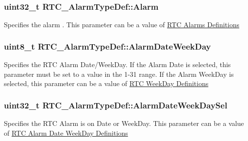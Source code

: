 \subsubsection[{\texorpdfstring{Alarm}{Alarm}}]{\setlength{\rightskip}{0pt plus 5cm}uint32\+\_\+t R\+T\+C\+\_\+\+Alarm\+Type\+Def\+::\+Alarm}\hypertarget{struct_r_t_c___alarm_type_def_a2f11f60569f34b15c09096928f30ab24}{}\label{struct_r_t_c___alarm_type_def_a2f11f60569f34b15c09096928f30ab24}
Specifies the alarm . This parameter can be a value of \hyperlink{group___r_t_c___alarms___definitions}{R\+TC Alarms Definitions} 
\subsubsection[{\texorpdfstring{Alarm\+Date\+Week\+Day}{AlarmDateWeekDay}}]{\setlength{\rightskip}{0pt plus 5cm}uint8\+\_\+t R\+T\+C\+\_\+\+Alarm\+Type\+Def\+::\+Alarm\+Date\+Week\+Day}\hypertarget{struct_r_t_c___alarm_type_def_a0c437cb24f8b12e753e522bf0c48a4d7}{}\label{struct_r_t_c___alarm_type_def_a0c437cb24f8b12e753e522bf0c48a4d7}
Specifies the R\+TC Alarm Date/\+Week\+Day. If the Alarm Date is selected, this parameter must be set to a value in the 1-\/31 range. If the Alarm Week\+Day is selected, this parameter can be a value of \hyperlink{group___r_t_c___week_day___definitions}{R\+TC Week\+Day Definitions} 
\subsubsection[{\texorpdfstring{Alarm\+Date\+Week\+Day\+Sel}{AlarmDateWeekDaySel}}]{\setlength{\rightskip}{0pt plus 5cm}uint32\+\_\+t R\+T\+C\+\_\+\+Alarm\+Type\+Def\+::\+Alarm\+Date\+Week\+Day\+Sel}\hypertarget{struct_r_t_c___alarm_type_def_a366ce4c7ad04d5a29550d30d93361324}{}\label{struct_r_t_c___alarm_type_def_a366ce4c7ad04d5a29550d30d93361324}
Specifies the R\+TC Alarm is on Date or Week\+Day. This parameter can be a value of \hyperlink{group___r_t_c___alarm_date_week_day___definitions}{R\+TC Alarm Date Week\+Day Definitions} 
